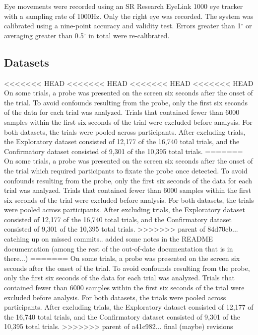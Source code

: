 \documentclass[
  english,
  man, donotrepeattitle,floatsintext]{apa6}
\begin{document}
Eye movements were recorded using an SR Research EyeLink 1000 eye tracker with a sampling rate of 1000Hz. Only the right eye was recorded. The system was calibrated using a nine-point accuracy and validity test. Errors greater than 1\(^{\circ}\) or averaging greater than 0.5\(^{\circ}\) in total were re-calibrated.

\subsection{Datasets}

<<<<<<< HEAD
<<<<<<< HEAD
<<<<<<< HEAD
<<<<<<< HEAD
On some trials, a probe was presented on the screen six seconds after the onset of the trial. To avoid confounds resulting from the probe, only the first six seconds of the data for each trial was analyzed. Trials that contained fewer than 6000 samples within the first six seconds of the trial were excluded before analysis. For both datasets, the trials were pooled across participants. After excluding trials, the Exploratory dataset consisted of 12,177 of the 16,740 total trials, and the Confirmatory dataset consisted of 9,301 of the 10,395 total trials.
=======
On some trials, a probe was presented on the screen six seconds after the onset of the trial which required participants to fixate the probe once detected. To avoid confounds resulting from the probe, only the first six seconds of the data for each trial was analyzed. Trials that contained fewer than 6000 samples within the first six seconds of the trial were excluded before analysis. For both datasets, the trials were pooled across participants. After excluding trials, the Exploratory dataset consisted of 12,177 of the 16,740 total trials, and the Confirmatory dataset consisted of 9,301 of the 10,395 total trials.
>>>>>>> parent of 84d70eb... catching up on missed commits.. added some notes in the README documentation (among the rest of the out-of-date documentation that is in there...)
=======
On some trials, a probe was presented on the screen six seconds after the onset of the trial. To avoid confounds resulting from the probe, only the first six seconds of the data for each trial was analyzed. Trials that contained fewer than 6000 samples within the first six seconds of the trial were excluded before analysis. For both datasets, the trials were pooled across participants. After excluding trials, the Exploratory dataset consisted of 12,177 of the 16,740 total trials, and the Confirmatory dataset consisted of 9,301 of the 10,395 total trials.
>>>>>>> parent of a41c982... final (maybe) revisions
\end{document}
